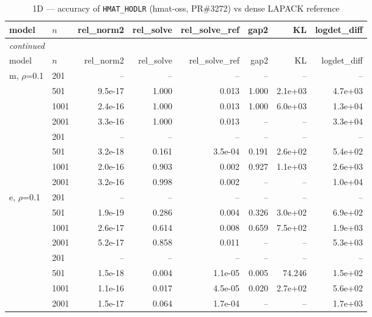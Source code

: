 \documentclass[11pt,a4paper]{article}
\begin{document}
\small\begin{center}
\begin{longtable}{llrrrrrr}
\caption{1D --- accuracy of \texttt{HMAT\_HODLR} (hmat-oss, PR\#3272) vs dense LAPACK reference}
\\\toprule
model & $n$ & rel\_norm2 & rel\_solve & rel\_solve\_ref & gap2 & KL & logdet\_diff\\
\midrule
\endfirsthead
\multicolumn{8}{l}{\small\emph{continued}}\\
\toprule
model & $n$ & rel\_norm2 & rel\_solve & rel\_solve\_ref & gap2 & KL & logdet\_diff\\
\midrule
\endhead

m, $\rho$=0.1 & 201 & -- & -- & -- & -- & -- & --\\
 & 501 & 9.5e-17 & 1.000 & 0.013 & 1.000 & 2.1e+03 & 4.7e+03\\
 & 1001 & 2.4e-16 & 1.000 & 0.013 & 1.000 & 6.0e+03 & 1.3e+04\\
 & 2001 & 3.3e-16 & 1.000 & 0.013 & -- & -- & 3.3e+04\\
 & 201 & -- & -- & -- & -- & -- & --\\
 & 501 & 3.2e-18 & 0.161 & 3.5e-04 & 0.191 & 2.6e+02 & 5.4e+02\\
 & 1001 & 2.0e-16 & 0.903 & 0.002 & 0.927 & 1.1e+03 & 2.6e+03\\
 & 2001 & 3.2e-16 & 0.998 & 0.002 & -- & -- & 1.0e+04\\
e, $\rho$=0.1 & 201 & -- & -- & -- & -- & -- & --\\
 & 501 & 1.9e-19 & 0.286 & 0.004 & 0.326 & 3.0e+02 & 6.9e+02\\
 & 1001 & 2.6e-17 & 0.614 & 0.008 & 0.659 & 7.5e+02 & 1.9e+03\\
 & 2001 & 5.2e-17 & 0.858 & 0.011 & -- & -- & 5.3e+03\\
 & 201 & -- & -- & -- & -- & -- & --\\
 & 501 & 1.5e-18 & 0.004 & 1.1e-05 & 0.005 & 74.246 & 1.5e+02\\
 & 1001 & 1.1e-16 & 0.017 & 4.5e-05 & 0.020 & 2.7e+02 & 5.6e+02\\
 & 2001 & 1.5e-17 & 0.064 & 1.7e-04 & -- & -- & 1.7e+03\\
\bottomrule\end{longtable}\end{center}
\end{document}
